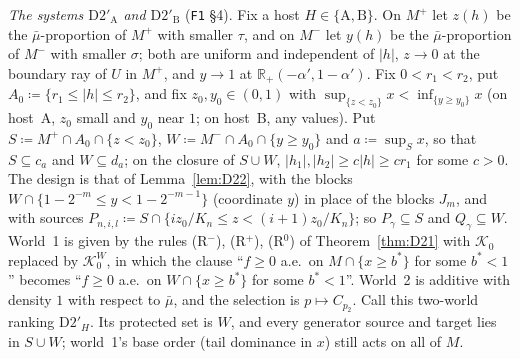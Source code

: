 \documentclass[11pt]{article}
\theoremstyle{definition}
\theoremstyle{remark}
\newcommand{\R}{\mathbb R}
\newcommand{\src}[1]{\texttt{#1}}
\begin{document}
\emph{The systems $\mathrm{D2}'_{\mathrm A}$ and $\mathrm{D2}'_{\mathrm B}$} (\src{F1} \S4). Fix a host $H\in\{\mathrm A,\mathrm B\}$. On $M^+$ let $z(h)$ be the $\bar\mu$-proportion of $M^+$ with smaller $\tau$, and on $M^-$ let $y(h)$ be the $\bar\mu$-proportion of $M^-$ with smaller $\sigma$; both are uniform and independent of $|h|$, $z\to0$ at the boundary ray of $U$ in $M^+$, and $y\to1$ at $\R_+(-\alpha',1-\alpha')$. Fix $0<r_1<r_2$, put $A_0\coloneqq\{r_1\le|h|\le r_2\}$, and fix $z_0,y_0\in(0,1)$ with $\sup_{\{z<z_0\}}x<\inf_{\{y\ge y_0\}}x$ (on host~A, $z_0$ small and $y_0$ near $1$; on host~B, any values). Put $S\coloneqq M^+\cap A_0\cap\{z<z_0\}$, $W\coloneqq M^-\cap A_0\cap\{y\ge y_0\}$ and $a\coloneqq\sup_Sx$, so that $S\subseteq c_a$ and $W\subseteq d_a$; on the closure of $S\cup W$, $|h_1|,|h_2|\ge c|h|\ge cr_1$ for some $c>0$. The design is that of Lemma~\ref{lem:D22}, with the blocks $W\cap\{1-2^{-m}\le y<1-2^{-m-1}\}$ (coordinate $y$) in place of the blocks $J_m$, and with sources $P_{n,i,l}\coloneqq S\cap\{iz_0/K_n\le z<(i+1)z_0/K_n\}$; so $P_\gamma\subseteq S$ and $Q_\gamma\subseteq W$. World~1 is given by the rules (R$^-$), (R$^+$), (R$^0$) of Theorem~\ref{thm:D21} with $\mathcal K_0$ replaced by $\mathcal K_0^W$, in which the clause ``$f\ge0$ a.e.\ on $M\cap\{x\ge b^*\}$ for some $b^*<1$'' becomes ``$f\ge0$ a.e.\ on $W\cap\{x\ge b^*\}$ for some $b^*<1$''. World~2 is additive with density $1$ with respect to $\bar\mu$, and the selection is $p\mapsto C_{p_2}$. Call this two-world ranking $\mathrm{D2}'_H$. Its protected set is $W$, and every generator source and target lies in $S\cup W$; world~1's base order (tail dominance in $x$) still acts on all of $M$.
\end{document}
